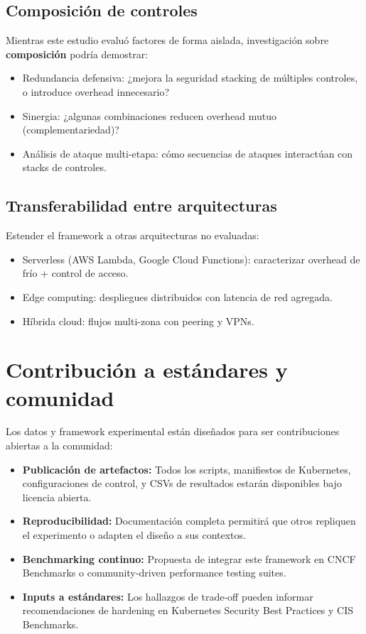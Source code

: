 \subsection{Composición de controles}

Mientras este estudio evaluó factores de forma aislada, investigación sobre \textbf{composición} podría demostrar:
\begin{itemize}
	\item Redundancia defensiva: ¿mejora la seguridad stacking de múltiples controles, o introduce overhead innecesario?
	\item Sinergia: ¿algunas combinaciones reducen overhead mutuo (complementariedad)?
	\item Análisis de ataque multi-etapa: cómo secuencias de ataques interactúan con stacks de controles.
\end{itemize}

\subsection{Transferabilidad entre arquitecturas}

Estender el framework a otras arquitecturas no evaluadas:
\begin{itemize}
	\item Serverless (AWS Lambda, Google Cloud Functions): caracterizar overhead de frío + control de acceso.
	\item Edge computing: despliegues distribuidos con latencia de red agregada.
	\item Híbrida cloud: flujos multi-zona con peering y VPNs.
\end{itemize}

\section{Contribución a estándares y comunidad}

Los datos y framework experimental están diseñados para ser contribuciones abiertas a la comunidad:

\begin{itemize}
	\item \textbf{Publicación de artefactos:} Todos los scripts, manifiestos de Kubernetes, configuraciones de control, y CSVs de resultados estarán disponibles bajo licencia abierta.
	\item \textbf{Reproducibilidad:} Documentación completa permitirá que otros repliquen el experimento o adapten el diseño a sus contextos.
	\item \textbf{Benchmarking continuo:} Propuesta de integrar este framework en CNCF Benchmarks o community-driven performance testing suites.
	\item \textbf{Inputs a estándares:} Los hallazgos de trade-off pueden informar recomendaciones de hardening en Kubernetes Security Best Practices y CIS Benchmarks.
\end{itemize}

